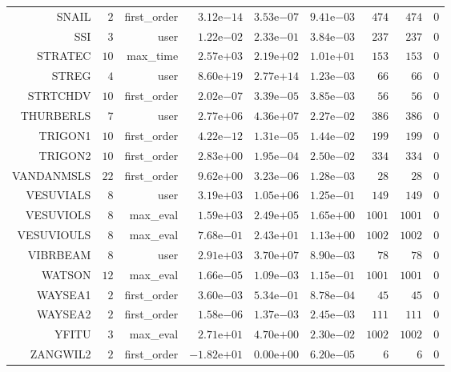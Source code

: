 \begin{longtable}{rrrrrrrrr}
SNAIL & \(     2\) & first\_order & \( 3.12\)e\(-14\) & \( 3.53\)e\(-07\) & \( 9.41\)e\(-03\) & \(   474\) & \(   474\) & \(     0\) \\
SSI & \(     3\) & user & \( 1.22\)e\(-02\) & \( 2.33\)e\(-01\) & \( 3.84\)e\(-03\) & \(   237\) & \(   237\) & \(     0\) \\
STRATEC & \(    10\) & max\_time & \( 2.57\)e\(+03\) & \( 2.19\)e\(+02\) & \( 1.01\)e\(+01\) & \(   153\) & \(   153\) & \(     0\) \\
STREG & \(     4\) & user & \( 8.60\)e\(+19\) & \( 2.77\)e\(+14\) & \( 1.23\)e\(-03\) & \(    66\) & \(    66\) & \(     0\) \\
STRTCHDV & \(    10\) & first\_order & \( 2.02\)e\(-07\) & \( 3.39\)e\(-05\) & \( 3.85\)e\(-03\) & \(    56\) & \(    56\) & \(     0\) \\
THURBERLS & \(     7\) & user & \( 2.77\)e\(+06\) & \( 4.36\)e\(+07\) & \( 2.27\)e\(-02\) & \(   386\) & \(   386\) & \(     0\) \\
TRIGON1 & \(    10\) & first\_order & \( 4.22\)e\(-12\) & \( 1.31\)e\(-05\) & \( 1.44\)e\(-02\) & \(   199\) & \(   199\) & \(     0\) \\
TRIGON2 & \(    10\) & first\_order & \( 2.83\)e\(+00\) & \( 1.95\)e\(-04\) & \( 2.50\)e\(-02\) & \(   334\) & \(   334\) & \(     0\) \\
VANDANMSLS & \(    22\) & first\_order & \( 9.62\)e\(+00\) & \( 3.23\)e\(-06\) & \( 1.28\)e\(-03\) & \(    28\) & \(    28\) & \(     0\) \\
VESUVIALS & \(     8\) & user & \( 3.19\)e\(+03\) & \( 1.05\)e\(+06\) & \( 1.25\)e\(-01\) & \(   149\) & \(   149\) & \(     0\) \\
VESUVIOLS & \(     8\) & max\_eval & \( 1.59\)e\(+03\) & \( 2.49\)e\(+05\) & \( 1.65\)e\(+00\) & \(  1001\) & \(  1001\) & \(     0\) \\
VESUVIOULS & \(     8\) & max\_eval & \( 7.68\)e\(-01\) & \( 2.43\)e\(+01\) & \( 1.13\)e\(+00\) & \(  1002\) & \(  1002\) & \(     0\) \\
VIBRBEAM & \(     8\) & user & \( 2.91\)e\(+03\) & \( 3.70\)e\(+07\) & \( 8.90\)e\(-03\) & \(    78\) & \(    78\) & \(     0\) \\
WATSON & \(    12\) & max\_eval & \( 1.66\)e\(-05\) & \( 1.09\)e\(-03\) & \( 1.15\)e\(-01\) & \(  1001\) & \(  1001\) & \(     0\) \\
WAYSEA1 & \(     2\) & first\_order & \( 3.60\)e\(-03\) & \( 5.34\)e\(-01\) & \( 8.78\)e\(-04\) & \(    45\) & \(    45\) & \(     0\) \\
WAYSEA2 & \(     2\) & first\_order & \( 1.58\)e\(-06\) & \( 1.37\)e\(-03\) & \( 2.45\)e\(-03\) & \(   111\) & \(   111\) & \(     0\) \\
YFITU & \(     3\) & max\_eval & \( 2.71\)e\(+01\) & \( 4.70\)e\(+00\) & \( 2.30\)e\(-02\) & \(  1002\) & \(  1002\) & \(     0\) \\
ZANGWIL2 & \(     2\) & first\_order & \(-1.82\)e\(+01\) & \( 0.00\)e\(+00\) & \( 6.20\)e\(-05\) & \(     6\) & \(     6\) & \(     0\) \\\hline
\end{longtable}
